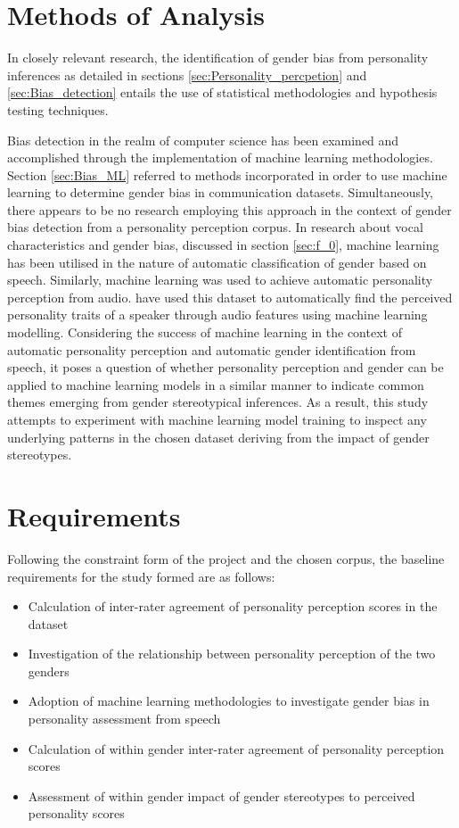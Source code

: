 \documentclass{l4proj}
\begin{document}
\section{Methods of Analysis}
In closely relevant research, the identification of gender bias from personality inferences as detailed in sections \ref{sec:Personality_percpetion} and \ref{sec:Bias_detection} entails the use of statistical methodologies and hypothesis testing techniques. 

Bias detection in the realm of computer science has been examined and accomplished through the implementation of machine learning methodologies. Section \ref{sec:Bias_ML} referred to methods incorporated in order to use machine learning to determine gender bias in communication datasets. Simultaneously, there appears to be no research employing this approach in the context of gender bias detection from a personality perception corpus. 
In research about vocal characteristics and gender bias, discussed in section \ref{sec:f_0}, machine learning has been utilised in the nature of automatic classification of gender based on speech. Similarly, machine learning was used to achieve automatic personality perception from audio. \citet{Mohammadi2012} have used this dataset to automatically find the perceived personality traits of a speaker through audio features using machine learning modelling. Considering the success of machine learning in the context of automatic personality perception and automatic gender identification from speech, it poses a question of whether personality perception and gender can be applied to machine learning models in a similar manner to indicate common themes emerging from gender stereotypical inferences. As a result, this study attempts to experiment with machine learning model training to inspect any underlying patterns in the chosen dataset deriving from the impact of gender stereotypes. 

\section{Requirements}
Following the constraint form of the project and the chosen corpus, the baseline requirements for the study formed are as follows:
\begin{itemize}
    \item Calculation of inter-rater agreement of personality perception scores in the dataset
    \item Investigation of the relationship between personality perception of the two genders
    \item Adoption of machine learning methodologies to investigate gender bias in personality assessment from speech
    \item Calculation of within gender inter-rater agreement of personality perception scores
    \item Assessment of within gender impact of gender stereotypes to perceived personality scores
\end{itemize}
\end{document}
